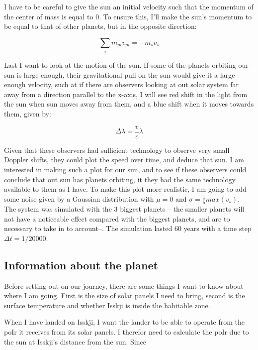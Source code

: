 \documentclass[a4paper, 10pt]{article}
\begin{document}
I have to be careful to give the sun an initial velocity such that the momentum of the center of mass is equal to 0. To ensure this, I'll make the sun's momentum to be equal to that of other planets, but in the opposite direction:

\begin{equation}
\sum\limits_i m_{pi}v_{pi} = -m_sv_s
\end{equation}

Last I want to look at the motion of the sun. If some of the planets orbiting our sun is large enough, their gravitational pull on the sun would give it a large enough velocity, such at if there are observers looking at out solar system far away from a direction parallel to the x-axis, I will see red shift in the light from the sun when sun moves away from them, and a blue shift when it moves towards them, given by:

\begin{equation}
\Delta \lambda = \frac{v}{c}\lambda
\end{equation}

Given that these observers had sufficient technology to observe very small Doppler shifts, they could plot the speed over time, and deduce that sun. I am interested in making such a plot for our sun, and to see if these observers could conclude that out sun has planets orbiting, it they had the same technology available to them as I have. To make this plot more realistic, I am going to add some noise given by a Gaussian distribution with $\mu = 0$ and $\sigma = \frac{1}{5} max(v_s)$.\\

The system was simulated with the 3 biggest planets -- the smaller planets will not have a noticeable effect compared with the biggest planets, and are to necessary to take in to account--. The simulation lasted 60 years with a time step $\Delta t = 1/20000$.

\subsection{Information about the planet}
Before setting out on our journey, there are some things I want to know about where I am going. First is the size of solar panels I need to bring, second is the surface temperature and whether Isskji is inside the habitable zone.

When I have landed on Isskji, I want the lander to be able to operate from the poIr it receives from its solar panels. I therefor need to calculate the poIr due to the sun at Isskji's distance from the sun. Since 
\end{document}
